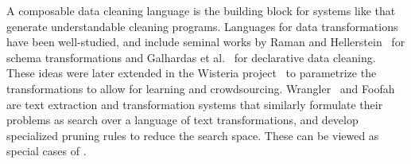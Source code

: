  A composable data cleaning language is the building block for systems like \sys that generate understandable cleaning programs.   Languages for data transformations have been well-studied, and include seminal works by Raman and Hellerstein~\cite{raman2001potter} for schema transformations and Galhardas et al.~\cite{DBLP:conf/vldb/GalhardasFSSS01} for declarative data cleaning. These ideas were later extended in the Wisteria project~\cite{DBLP:journals/pvldb/HaasKWF015} to parametrize the transformations to allow for learning and crowdsourcing.   Wrangler~\cite{wrangler} and Foofah~\cite{jin2017foofah} are text extraction and transformation systems that similarly formulate their problems as search over a language of text transformations, and develop specialized pruning rules to reduce the search space.   These can be viewed as special cases of \sys.



